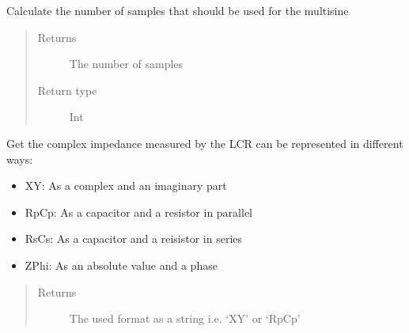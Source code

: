\documentclass[letterpaper,10pt,english]{sphinxmanual}
\begin{document}
\begin{fulllineitems}
\begin{fulllineitems}
\end{fulllineitems}


\begin{fulllineitems}
\label{\detokenize{index:TiePieLCR_settings.TiePieLCR_settings.get_gen_samples}}
\sphinxAtStartPar
Calculate the number of samples that should be used for the multisine
\begin{quote}\begin{description}
\item[{Returns}] \leavevmode
\sphinxAtStartPar
The number of samples

\item[{Return type}] \leavevmode
\sphinxAtStartPar
Int

\end{description}\end{quote}

\end{fulllineitems}


\begin{fulllineitems}
\label{\detokenize{index:TiePieLCR_settings.TiePieLCR_settings.get_impedance_format}}
\sphinxAtStartPar
Get the complex impedance measured by the LCR can be represented in different ways:
\begin{itemize}
\item {} 
\sphinxAtStartPar
XY: As a complex and an imaginary part

\item {} 
\sphinxAtStartPar
RpCp: As a capacitor and a resistor in parallel

\item {} 
\sphinxAtStartPar
RsCs: As a capacitor and a reisistor in series

\item {} 
\sphinxAtStartPar
ZPhi: As an absolute value and a phase

\end{itemize}
\begin{quote}\begin{description}
\item[{Returns}] \leavevmode
\sphinxAtStartPar
The used format as a string i.e. ‘XY’ or ‘RpCp’


\end{description}
\end{quote}
\end{fulllineitems}
\end{fulllineitems}
\end{document}
